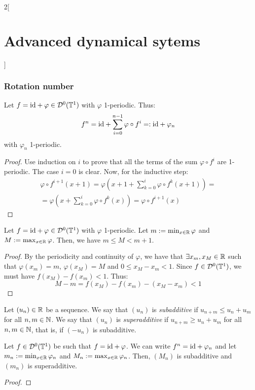 \documentclass[../../../main_math.tex]{subfiles}
\begin{document}
\begin{multicols}{2}[\section{Advanced dynamical sytems}]
  \subsubsection{Rotation number}\label{ADS:rotation_number_section}
  \begin{lemma}\label{ADS:lema_sum}
    Let $f=\mathrm{id}+\varphi\in\mathcal{D}^0(\mathbb{T}^1)$ with $\varphi$ 1-periodic. Thus:
    $$
      f^n=\mathrm{id} + \sum_{i=0}^{n-1} \varphi\circ f^i=: \mathrm{id} + \varphi_n
    $$
    with $\varphi_n$ 1-periodic.
  \end{lemma}
  \begin{proof}
    Use induction on $i$ to prove that all the terms of the sum $\varphi\circ f^i$ are 1-periodic. The case $i=0$ is clear. Now, for the inductive step:
    \begin{multline*}
      \varphi\circ f^{i+1}(x+1)=\varphi\left(x+1+\sum_{k=0}^{i}\varphi\circ f^k(x+1)\right)=\\=\varphi\left( x+\sum_{k=0}^{i}\varphi\circ f^k(x)\right)=\varphi\circ f^{i+1}(x)
    \end{multline*}
  \end{proof}
  \begin{lemma}\label{ADS:lema1}
    Let $f=\mathrm{id}+\varphi\in\mathcal{D}^0(\mathbb{T}^1)$ with $\varphi$ 1-periodic. Let $m:=\min_{x\in\mathbb{R}}\varphi$ and $M:=\max_{x\in\mathbb{R}}\varphi$. Then, we have $m\leq M< m+1$.
  \end{lemma}
  \begin{proof}
    By the periodicity and continuity of $\varphi$, we have that $\exists x_m, x_M\in\mathbb{R}$ such that $\varphi(x_m)=m$, $\varphi(x_M)=M$ and $0\leq x_M-x_m<1$. Since $f\in \mathcal{D}^0(\mathbb{T}^1)$, we must have $f(x_M)-f(x_m)<1$. Thus:
    $$
      M-m=f(x_M)-f(x_m)-(x_M-x_m)<1
    $$
  \end{proof}
  \begin{definition}
    Let ${(u_n)}\in\mathbb{R}$ be a sequence. We say that $(u_n)$ is \emph{subadditive} if $u_{n+m}\leq u_n+u_m$ for all $n,m\in\mathbb{N}$. We say that $(u_n)$ is \emph{superadditive} if $u_{n+m}\geq u_n+u_m$ for all $n,m\in\mathbb{N}$, that is, if $(-u_n)$ is subadditive.
  \end{definition}
  \begin{lemma}\label{ADS:lema2}
    Let $f\in \mathcal{D}^0(\mathbb{T}^1)$ be such that $f=\mathrm{id} +\varphi$. We can write $f^n=\mathrm{id} +\varphi_n$ and let $m_n:=\min_{x\in\mathbb{R}}\varphi_n$ and $M_n:=\max_{x\in\mathbb{R}}\varphi_n$. Then, $(M_n)$ is subadditive and $(m_n)$ is superadditive.
  \end{lemma}
  \begin{proof}

\end{proof}
\end{multicols}
\end{document}
